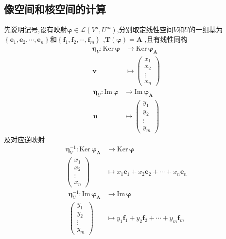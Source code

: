 \subsection{像空间和核空间的计算}
\begin{red}
\begin{remark}
    先说明记号,设有映射$\bm{\varphi}\in \mathcal{L}\left(V^n,U^m\right)$,分别取定线性空间$V$和$U$的一组基为
    $\left\{\bm{e}_1,\bm{e}_2,\cdots,\bm{e}_n\right\}$和$\left\{\bm{f}_1,\bm{f}_2,\cdots,\bm{f}_m\right\}$
    ,$\bm{T}\left(\bm{\varphi}\right)=\bm{A}$
    ,且有线性同构
    \begin{align*}
        \bm{\eta}_V:\mathrm{Ker}\,\bm{\varphi}&\longrightarrow \mathrm{Ker}\,\bm{\varphi}_{\bm{A}}\\
        \bm{v}&\longmapsto \begin{pmatrix}
            x_1\\x_2\\\vdots\\x_n
        \end{pmatrix}
    \end{align*}
    \begin{align*}
        \bm{\eta}_U:\mathrm{Im}\,\bm{\varphi}&\longrightarrow \mathrm{Im}\,\bm{\varphi}_{\bm{A}}\\
        \bm{u}&\longmapsto \begin{pmatrix}
            y_1\\y_2\\\vdots\\y_m
        \end{pmatrix}
    \end{align*}
    及对应逆映射
    \begin{align*}
    \bm{\eta}_V^{-1}:\mathrm{Ker}\,\bm{\varphi}_{\bm{A}}&\longrightarrow \mathrm{Ker}\,\bm{\varphi}\\
    \begin{pmatrix}
        x_1\\x_2\\\vdots\\x_n
    \end{pmatrix}&\longmapsto
    x_1\bm{e}_1+x_2\bm{e}_2+\cdots+x_n\bm{e}_n
\end{align*}
    \begin{align*}
        \bm{\eta}_U^{-1}:\mathrm{Im}\,\bm{\varphi}_{\bm{A}}&\longrightarrow \mathrm{Im}\,\bm{\varphi}\\
        \begin{pmatrix}
            y_1\\y_2\\\vdots\\y_m
        \end{pmatrix}&\longmapsto
        y_1\bm{f}_1+y_2\bm{f}_2+\cdots+y_m\bm{f}_m
    \end{align*}
\end{remark}
\end{red}
